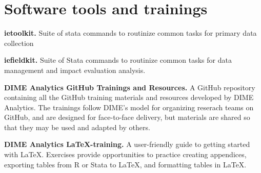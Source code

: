 
\section{Software tools and trainings}

\textbf{ietoolkit.}
Suite of stata commands to routinize common tasks for primary data collection

\textbf{iefieldkit.}
Suite of Stata commands to routinize common tasks for data management and impact evaluation analysis. 

\textbf{DIME Analytics GitHub Trainings and Resources.}
A GitHub repository containing all the GitHub training materials and resources developed by DIME Analytics. The trainings follow DIME's model for organizing reserach teams on GitHub, and are designed for face-to-face delivery, but materials are shared so that they may be used and adapted by others. 

\textbf{DIME Analytics \LaTeX-training.}
A user-friendly guide to getting started with LaTeX. Exercises provide opportunities to practice creating appendices, exporting tables from R or Stata to LaTeX, and formatting tables in LaTeX. 


\mainmatter
